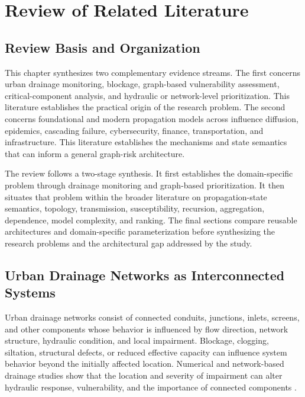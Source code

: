 \section{Review of Related Literature}\label{review-of-related-literature}

\subsection{Review Basis and Organization}\label{review-basis-and-organization}
This chapter synthesizes two complementary evidence streams. The first
concerns urban drainage monitoring, blockage, graph-based vulnerability
assessment, critical-component analysis, and hydraulic or network-level
prioritization. This literature establishes the practical origin of the
research problem. The second concerns foundational and modern
propagation models across influence diffusion, epidemics, cascading
failure, cybersecurity, finance, transportation, and infrastructure.
This literature establishes the mechanisms and state semantics that can
inform a general graph-risk architecture.

The review follows a two-stage synthesis. It first establishes the
domain-specific problem through drainage monitoring and graph-based
prioritization. It then situates that problem within the broader
literature on propagation-state semantics, topology, transmission,
susceptibility, recursion, aggregation, dependence, model complexity,
and ranking. The final sections compare reusable architectures and
domain-specific parameterization before synthesizing the research
problems and the architectural gap addressed by the study.

\subsection{Urban Drainage Networks as Interconnected
Systems}\label{urban-drainage-networks-as-interconnected-systems}

Urban drainage networks consist of connected conduits, junctions,
inlets, screens, and other components whose behavior is influenced by
flow direction, network structure, hydraulic condition, and local
impairment. Blockage, clogging, siltation, structural defects, or
reduced effective capacity can influence system behavior beyond the
initially affected location. Numerical and network-based drainage
studies show that the location and severity of impairment can alter
hydraulic response, vulnerability, and the importance of connected
components \citep{simone2022,simone2023,reyes2020,dastgir2023,dastgir2024,meijer2023,zhang2025}.


